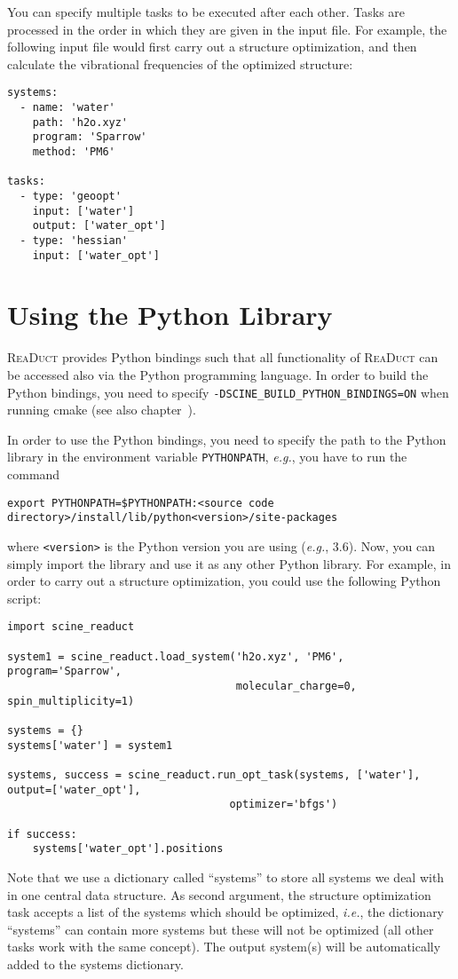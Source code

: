 \documentclass[]{tufte-book}
\begin{document}
You can specify multiple tasks to be executed after each other. Tasks are processed in the order in which they are given in 
the input file. For example, the following input file would first carry out a structure optimization, and then calculate
the vibrational frequencies of the optimized structure:

\begin{verbatim}
systems:
  - name: 'water'
    path: 'h2o.xyz'
    program: 'Sparrow'
    method: 'PM6'

tasks:
  - type: 'geoopt'
    input: ['water']
    output: ['water_opt']
  - type: 'hessian'
    input: ['water_opt']
\end{verbatim}



\chapter{Using the Python Library}

\textsc{ReaDuct} provides Python bindings such that all functionality of \textsc{ReaDuct} can be accessed also via the
Python programming language. In order to build the Python bindings, you need to specify \texttt{-DSCINE\_BUILD\_PYTHON\_BINDINGS=ON}
when running cmake (see also chapter~).

In order to use the Python bindings, you need to specify the path to the Python library in the environment variable
\texttt{PYTHONPATH}, \textit{e.g.}, you have to run the command
\begin{verbatim}
export PYTHONPATH=$PYTHONPATH:<source code directory>/install/lib/python<version>/site-packages
\end{verbatim}
where \texttt{<version>} is the Python version you are using (\textit{e.g.}, 3.6). Now, you can simply import the library 
and use it as any other Python library. For example, in order to carry out a structure optimization, you could use the 
following Python script:
\begin{verbatim}
import scine_readuct

system1 = scine_readuct.load_system('h2o.xyz', 'PM6', program='Sparrow', 
                                    molecular_charge=0, spin_multiplicity=1)

systems = {}
systems['water'] = system1

systems, success = scine_readuct.run_opt_task(systems, ['water'], output=['water_opt'], 
                                   optimizer='bfgs')

if success:
    systems['water_opt'].positions
\end{verbatim}
Note that we use a dictionary called ``systems'' to store all systems we deal with in one central data
structure. As second argument, the structure optimization task accepts a list of the systems which should be optimized,
\textit{i.e.}, the dictionary ``systems'' can contain more systems but these will not be optimized (all other tasks
work with the same concept). The output system(s) will be automatically added to the systems dictionary.
\end{document}
